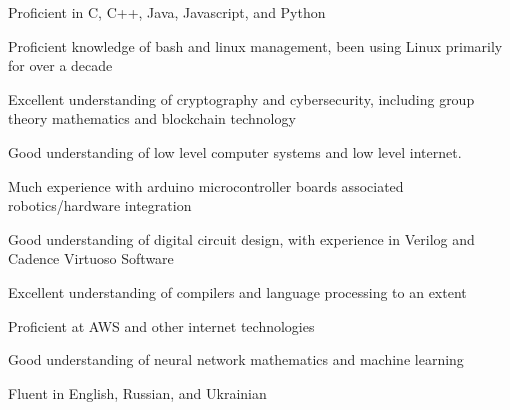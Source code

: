 

\begin{cvparagraph}

\;
    \begin{cvitems}
        \item Proficient in C, C++, Java, Javascript, and Python
        \item Proficient knowledge of bash and linux management, been using Linux primarily for over a decade
        \item Excellent understanding of cryptography and cybersecurity, including group theory mathematics and blockchain technology
        \item Good understanding of low level computer systems and low level internet.
        \item Much experience with arduino microcontroller boards associated robotics/hardware integration
        \item Good understanding of digital circuit design, with experience in Verilog and Cadence Virtuoso Software
        \item Excellent understanding of compilers and language processing to an extent
        \item Proficient at AWS and other internet technologies
        \item Good understanding of neural network mathematics and machine learning
        \item Fluent in English, Russian, and Ukrainian
    \end{cvitems}
\end{cvparagraph}
